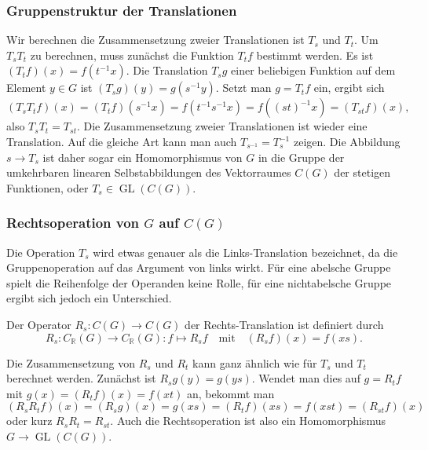 %
%
\subsubsection{Gruppenstruktur der Translationen}
Wir berechnen die Zusammensetzung zweier Translationen ist $T_s$ und $T_t$.
Um $T_sT_t$ zu berechnen, muss zunächst die Funktion $T_tf$ bestimmt werden.
Es ist $(T_tf)(x) = f(t^{-1}x)$.
Die Translation $T_sg$ einer beliebigen Funktion auf dem Element $y\in G$
ist $(T_sg)(y)=g(s^{-1}y)$.
Setzt man $g=T_tf$ ein, ergibt sich
\[
(T_sT_tf)(x)
=
(T_tf)(s^{-1}x)
=
f(t^{-1}s^{-1}x)
=
f((st)^{-1}x)
=
(T_{st}f)(x),
\]
also $T_sT_t=T_{st}$.
Die Zusammensetzung zweier Translationen ist wieder eine Translation.
Auf die gleiche Art kann man auch $T_{s^{-1}}=T_s^{-1}$ zeigen.
Die Abbildung $s\to T_s$ ist daher sogar ein Homomorphismus von $G$
in die Gruppe der umkehrbaren linearen Selbstabbildungen
des Vektorraumes $C(G)$ der stetigen Funktionen, oder
$T_s\in\operatorname{GL}(C(G))$.

%
%
\subsubsection{Rechtsoperation von $G$ auf $C(G)$}
Die Operation $T_s$ wird etwas genauer als die Links-Translation
bezeichnet, da die Gruppenoperation auf das Argument von links wirkt.
Für eine abelsche Gruppe spielt die Reihenfolge der Operanden keine
Rolle, für eine nichtabelsche Gruppe ergibt sich jedoch ein Unterschied.

\begin{definition}
Der Operator $R_s\colon C(G)\to C(G)$ der Rechts-Translation ist definiert
durch
\[
R_s
\colon
C_{\mathbb{R}}(G)\to C_{\mathbb{R}}(G)
:
f \mapsto R_sf
\quad\text{mit}\quad
(R_sf)(x) = f(xs).
\]
\end{definition}

Die Zusammensetzung von $R_s$ und $R_t$ kann ganz ähnlich wie für
$T_s$ und $T_t$ berechnet werden.
Zunächst ist $R_sg(y) = g(ys)$.
Wendet man dies auf $g=R_tf$ mit $g(x)=(R_tf)(x)=f(xt)$ an, bekommt man
\[
(R_sR_tf)(x)
=
(R_sg)(x)
=
g(xs)
=
(R_tf)(xs)
=
f(xst)
=
(R_{st}f)(x)
\]
oder kurz $R_sR_t=R_{st}$.
Auch die Rechtsoperation ist also ein Homomorphismus
$G\to\operatorname{GL}(C(G))$.



